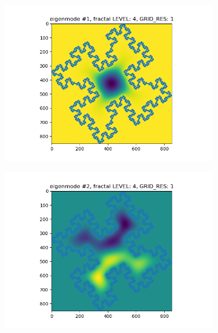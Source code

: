 \documentclass{article}
\begin{document}
\begin{figure}
    \begin{subfigure}{0.3\textwidth}
        \includegraphics[width=\linewidth]{./media/eigenmode_2d1.png}
    \end{subfigure}
    \begin{subfigure}{0.3\textwidth}
        \includegraphics[width=\linewidth]{./media/eigenmode_2d2.png}
    \end{subfigure}
    \begin{subfigure}{0.3\textwidth}

\end{subfigure}
\end{figure}
\end{document}
